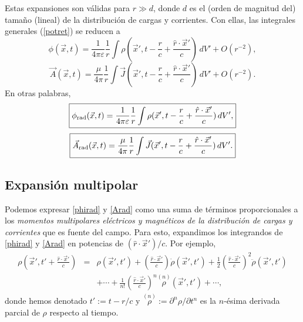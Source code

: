 Estas expansiones son válidas para $r\gg d$, donde $d$ es el (orden de magnitud del) tamaño (lineal) de la distribución de cargas y corrientes. Con ellas, las integrales generales (\ref{potret}) se reducen a
\begin{equation}
 \phi(\vec{x},t)=\frac{1}{4\pi\varepsilon}\frac{1}{r}\int\rho(\vec{x}',t-\frac{r}{c}+\frac{\hat{r}\cdot\vec{x}'}{c})\,dV'+O(r^{-2}),
\end{equation}
\begin{equation}
 \vec{A}(\vec{x},t)=\frac{\mu}{4\pi}\frac{1}{r}\int\vec{J}(\vec{x}',t-\frac{r}{c}+\frac{\hat{r}\cdot\vec{x}'}{c})\,dV'+O(r^{-2}).
\end{equation}
En otras palabras,
\begin{equation}
 \boxed{\phi_{\rm rad}(\vec{x},t)
=\frac{1}{4\pi\varepsilon}\frac{1}{r}\int\rho(\vec{x}',t-\frac{r}{c}+\frac{\hat{r}\cdot\vec{x}'}{c})\,dV',} \label{phirad}
\end{equation}
\begin{equation}
 \boxed{\vec{A}_{\rm rad}(\vec{x},t)
=\frac{\mu}{4\pi}\frac{1}{r}\int\vec{J}(\vec{x}',t-\frac{r}{c}+\frac{\hat{r}\cdot\vec{x}'}{c})\,dV'.} \label{Arad}
\end{equation}

\subsection{Expansión multipolar}\label{sec:emr}

Podemos expresar \eqref{phirad} y \eqref{Arad} como una suma de términos proporcionales a los \textit{momentos multipolares eléctricos y magnéticos de la distribución de cargas y corrientes} que es fuente del campo. Para esto, expandimos los integrandos de \eqref{phirad} y \eqref{Arad} en potencias de $(\hat{r}\cdot\vec{x}')/c$. Por ejemplo,
\begin{eqnarray}
 \rho(\vec{x}',t'+\frac{\hat{r}\cdot\vec{x}'}{c})&=&\rho(\vec{x}',t')+\left(\frac{\hat{r}\cdot\vec{x}'}{c}\right)\dot\rho(\vec{x}',t')+\frac{1}{2}\left(\frac{\hat{r}\cdot\vec{x}'}{c}\right)^2\ddot\rho(\vec{x}',t') \nonumber\\
 &&+\cdots+\frac{1}{n!}\left(\frac{\hat{r}\cdot\vec{x}'}{c}\right)^n\stackrel{(n)}{\rho}\!\!\!(\vec{x}',t')+\cdots ,
\end{eqnarray}
donde hemos denotado $t':=t-r/c$ y $\stackrel{(n)}{\rho}:=\partial^n\rho/\partial t^n$ es la $n$-ésima derivada parcial de $\rho$ respecto al tiempo.

